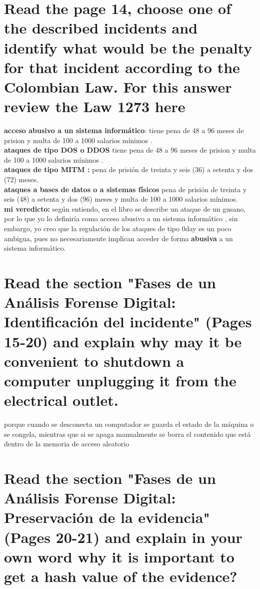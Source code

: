 \documentclass[10pt,a4paper]{article} %
\begin{document}
    \section{Read the page 14, choose one of the described incidents and
    identify what would be the penalty for that incident according to the
    Colombian Law. For this answer review the Law 1273 here}

        \textbf{acceso abusivo a un sistema informático}: tiene pena de 48 a 96
        meses de prision y multa de 100 a 1000 salarios mínimos .
        \\
        \textbf{ataques de tipo DOS o DDOS}  tiene pena de 48 a 96
        meses de prision y multa de 100 a 1000 salarios mínimos .
        \\
        \textbf{ataques de tipo MITM :} pena de prisión de treinta y seis (36)
            a setenta y dos (72) meses.
        \\
        \textbf{ataques a bases de datos o a sistemas físicos}  pena de
            prisión de treinta y seis (48) a setenta y dos (96) meses y multa
            de 100 a 1000 salarios mínimos.
            \\
        \textbf{mi veredicto:}
        según entiendo, en el libro se describe un ataque de un gusano, por lo
        que yo lo definiría como acceso abusivo a un sistema informático , sin
        embargo, yo creo que la regulación de los ataques de tipo 0day es un
        poco ambigua, pues no necesariamente implican acceder de forma
        \textbf{abusiva}  a un sistema informático.

    \section{Read the section "Fases de un Análisis Forense Digital:
    Identificación del incidente" (Pages 15-20) and explain why may it be
    convenient to shutdown a computer unplugging it from the electrical outlet.}
        porque cuando se desconecta un computador se guarda el estado de la
        máquina o se congela, mientras que si se apaga manualmente se borra el
        contenido que está dentro de la memoria de acceso aleatorio

    \section{Read the section "Fases de un Análisis Forense Digital:
    Preservación de la evidencia" (Pages 20-21) and explain in your own word
    why it is important to get a hash value of the evidence?}
\end{document}
